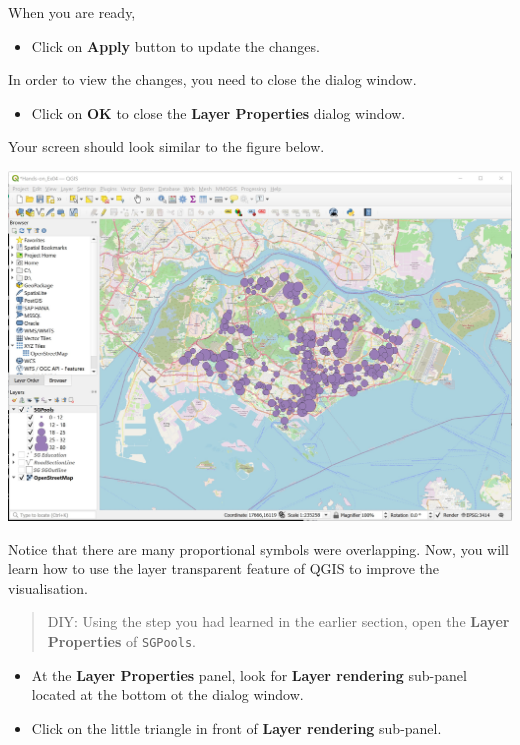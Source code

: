 \documentclass[
  letterpaper,
  DIV=11,
  numbers=noendperiod]{scrreprt}
\providecommand{\tightlist}{%
  \setlength{\itemsep}{0pt}\setlength{\parskip}{0pt}}\usepackage{longtable,booktabs,array}
\begin{document}
When you are ready,

\begin{itemize}
\tightlist
\item
  Click on \textbf{Apply} button to update the changes.
\end{itemize}

In order to view the changes, you need to close the dialog window.

\begin{itemize}
\tightlist
\item
  Click on \textbf{OK} to close the \textbf{Layer Properties} dialog
  window.
\end{itemize}

Your screen should look similar to the figure below.

\includegraphics{./img03/image14.jpg}

Notice that there are many proportional symbols were overlapping. Now,
you will learn how to use the layer transparent feature of QGIS to
improve the visualisation.

\begin{quote}
DIY: Using the step you had learned in the earlier section, open the
\textbf{Layer Properties} of \texttt{SGPools}.
\end{quote}

\begin{itemize}
\tightlist
\item
  At the \textbf{Layer Properties} panel, look for \textbf{Layer
  rendering} sub-panel located at the bottom ot the dialog window.
\item
  Click on the little triangle in front of \textbf{Layer rendering}
  sub-panel.
\end{itemize}
\end{document}
